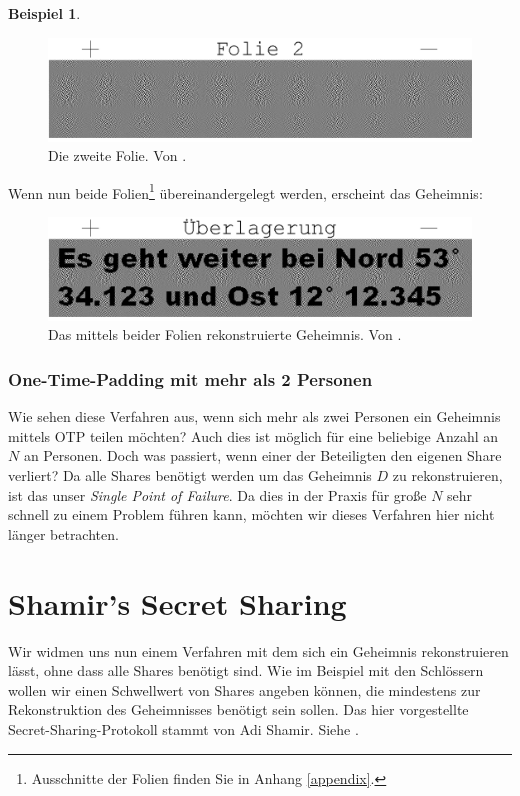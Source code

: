 \documentclass[12pt, a4paper, oneside, titlepage]{report}
\theoremstyle{definition}
\newtheorem{bsp}[lemma]{Beispiel}
\begin{document}
\begin{bsp}
		\begin{figure}[H]
			\centering
			\includegraphics[width=1.\textwidth]{images/visual3.png}
			\caption{Die zweite Folie. Von \cite{visual}.}
			\label{sheet2}
		\end{figure}
		\noindent
		Wenn nun beide Folien\footnote{Ausschnitte der Folien finden Sie in Anhang \ref{appendix}.} übereinandergelegt werden, erscheint das Geheimnis:
		
		\begin{figure}[H]
			\centering
			\includegraphics[width=1.\textwidth]{images/visual4.png}
			\caption{Das mittels beider Folien rekonstruierte Geheimnis. Von \cite{visual}.}
			\label{secret-image}
		\end{figure}
	\end{bsp}
	
	\subsubsection{One-Time-Padding mit mehr als 2 Personen}
	Wie sehen diese Verfahren aus, wenn sich mehr als zwei Personen ein Geheimnis mittels OTP teilen möchten? Auch dies ist möglich für eine beliebige Anzahl an $ N $ an Personen. Doch was passiert, wenn einer der Beteiligten den eigenen Share verliert? Da alle Shares benötigt werden um das Geheimnis $ D $ zu rekonstruieren, ist das unser \emph{Single Point of Failure}. Da dies in der Praxis für große $ N $ sehr schnell zu einem Problem führen kann, möchten wir dieses Verfahren hier nicht länger betrachten.
	
	\section{Shamir's Secret Sharing}
	
	Wir widmen uns nun einem Verfahren mit dem sich ein Geheimnis rekonstruieren lässt, ohne dass alle Shares benötigt sind. Wie im Beispiel mit den Schlössern wollen wir einen Schwellwert von Shares angeben können, die mindestens zur Rekonstruktion des Geheimnisses benötigt sein sollen. Das hier vorgestellte Secret-Sharing-Protokoll stammt von Adi Shamir. Siehe \cite{shamir}.
	
\end{document}
